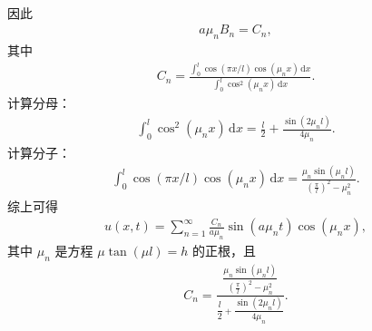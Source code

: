 \documentclass[../../main.tex]{subfiles}%
\begin{document}
\begin{solution}
\begin{enumerate}[(1)]
\begin{align*}
\end{align*}
因此
\begin{align*}
a\mu_n B_n=C_n,
\end{align*}
其中
\begin{align*}
C_n=\frac{\int_0^l\cos(\pi x/l)\cos(\mu_n x)\,\mathrm{d}x}{\int_0^l\cos^2(\mu_n x)\,\mathrm{d}x}.
\end{align*}
计算分母：
\begin{align*}
\int_0^l\cos^2(\mu_n x)\,\mathrm{d}x=\frac{l}{2}+\frac{\sin(2\mu_n l)}{4\mu_n}.
\end{align*}
计算分子：
\begin{align*}
\int_0^l\cos(\pi x/l)\cos(\mu_n x)\,\mathrm{d}x
=\frac{\mu_n\sin(\mu_n l)}{\left(\frac{\pi}{l}\right)^2-\mu_n^2}.
\end{align*}
综上可得
\begin{align*}
u(x,t)=\sum_{n=1}^{\infty}\frac{C_n}{a\mu_n}\sin(a\mu_n t)\cos(\mu_n x),
\end{align*}
其中 $\mu_n$ 是方程 $\mu\tan(\mu l)=h$ 的正根，且
\begin{align*}
C_n=\frac{\dfrac{\mu_n\sin(\mu_n l)}{\left(\frac{\pi}{l}\right)^2-\mu_n^2}}{\dfrac{l}{2}+\dfrac{\sin(2\mu_n l)}{4\mu_n}}.
\end{align*}
\end{enumerate}
\end{solution}
\end{document}
